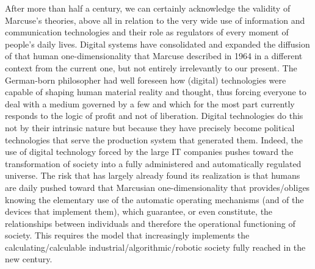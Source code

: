 After more than half a century, we can certainly acknowledge the validity of Marcuse's theories, above all in relation to the very wide use of information and communication technologies and their role as regulators of every moment of people's daily lives. Digital systems have consolidated and expanded the diffusion of that human one-dimensionality that Marcuse described in 1964 in a different context from the current one, but not entirely irrelevantly to our present. The German-born philosopher had well foreseen how (digital) technologies were capable of shaping human material reality and thought, thus forcing everyone to deal with a medium governed by a few and which for the most part currently responds to the logic of profit and not of liberation. Digital technologies do this not by their intrinsic nature but because they have precisely become political technologies that serve the production system that generated them. Indeed, the use of digital technology forced by the large IT companies pushes toward the transformation of society into a fully administered and automatically regulated universe. The risk that has largely already found its realization is that humans are daily pushed toward that Marcusian one-dimensionality that provides/obliges knowing the elementary use of the automatic operating mechanisms (and of the devices that implement them), which guarantee, or even constitute, the relationships between individuals and therefore the operational functioning of society. This requires the model that increasingly implements the calculating/calculable industrial/algorithmic/robotic society fully reached in the new century.

